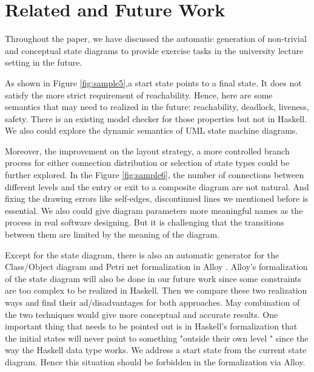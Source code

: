 \chapter{Related and Future Work}
\label{chap:Related and Future Work}

Throughout the paper, we have discussed the automatic generation of non-trivial and conceptual state diagrams to provide exercise tasks in the university lecture setting in the future.

As shown in Figure \ref{fig:sample5},a start state points to a final state.
It does not satisfy the more strict requirement of reachability.
Hence, here are some semantics that may need to realized in the future:
reachability, deadlock, liveness, safety. 
There is an existing model checker \cite{zou/Yiwei2021} for those properties but not in Haskell. 
We also could explore the dynamic semantics \cite{börger_cavarra_riccobene_2000} of UML state machine diagrams.

Moreover, the improvement on the layout strategy, a more controlled branch process for either connection distribution or selection of state types could be further explored. In the Figure \ref{fig:sample6}, the number of connections between different levels and the entry or exit to a composite diagram are not natural. And fixing the drawing errors like self-edges, discontinued lines we mentioned before is essential. We also could give diagram parameters more meaningful names as the process in real software designing. But it is challenging that the transitions between them are limited by the meaning of the diagram.

Except for the state diagram, there is also an automatic generator for the Class/Object diagram \cite{10.1007/978-3-030-35629-3_8,siegburg2020generating} and Petri net formalization in Alloy \cite{ke_wang}. 
Alloy's formalization of the state diagram will also be done in our future work since some constraints are too complex to be realized in Haskell.
Then we compare these two realization ways and find their ad/disadvantages for both approaches.
May combination of the two techniques would give more conceptual and accurate results.
One important thing that needs to be pointed out is in Haskell's formalization that the initial states will never point to something "outside their own level " since the way the Haskell data type works. 
We address a start state from the current state diagram.
Hence this situation should be forbidden in the formalization via Alloy.


